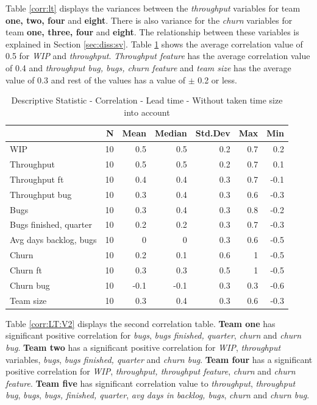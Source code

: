 \documentclass[UKenglish]{ifimaster}  %
\begin{document}
Table \ref{corr:lt} displays the variances between the \textit{throughput} variables for team \textbf{one, two, four} and \textbf{eight}. There is also variance for the \textit{churn} variables for team \textbf{one, three, four} and \textbf{eight}. The relationship between these variables is explained in Section \ref{sec:diss:sv}. Table \ref{DS:corr:LT} shows the average correlation value of 0.5 for \textit{WIP} and \textit{throughput}. \textit{Throughput feature} has the average correlation value of 0.4 and \textit{throughput bug, bugs, churn feature} and \textit{team size} has the average value of 0.3 and rest of the values has a value of $\pm$ 0.2 or less.



\begin{table}[H]
 \centering
 \begin{tabular}{ | l | r | r | r | r | r | r | }
 \hline
 & \bf{N} & \bf{Mean} & \bf{Median} & \bf{Std.Dev} & \bf{Max} & \bf{Min} \\ \hline
WIP  & 10 & 0.5 & 0.5 & 0.2 & 0.7 & 0.2\\ \hline
Throughput  & 10 & 0.5 & 0.5 & 0.2 & 0.7 & 0.1\\ \hline
Throughput ft  & 10 & 0.4 & 0.4 & 0.3 & 0.7 & -0.1\\ \hline
Throughput bug  & 10 & 0.3 & 0.4 & 0.3 & 0.6 & -0.3\\ \hline
Bugs  & 10 & 0.3 & 0.4 & 0.3 & 0.8 & -0.2\\ \hline
Bugs finished, quarter  & 10 & 0.2 & 0.2 & 0.3 & 0.7 & -0.3\\ \hline
Avg days backlog, bugs  & 10 & 0 & 0 & 0.3 & 0.6 & -0.5\\ \hline
Churn  & 10 & 0.2 & 0.1 & 0.6 & 1 & -0.5\\ \hline
Churn ft  & 10 & 0.3 & 0.3 & 0.5 & 1 & -0.5\\ \hline
Churn bug  & 10 & -0.1 & -0.1 & 0.3 & 0.3 & -0.6\\ \hline
Team size  & 10 & 0.3 & 0.4 & 0.3 & 0.6 & -0.3\\ \hline
\end{tabular}
 \caption{Descriptive Statistic - Correlation - Lead time - Without taken time size into account}
 \label{DS:corr:LT}
 \end{table}

Table \ref{corr:LT:V2} displays the second correlation table. \textbf{Team one} has significant positive correlation for \textit{bugs}, \textit{bugs finished, quarter}, \textit{churn} and \textit{churn bug}. \textbf{Team two} has a significant positive correlation for  \textit{WIP}, \textit{throughput} variables, \textit{bugs}, \textit{bugs finished, quarter} and \textit{churn bug}.  \textbf{Team four} has a significant positive correlation for \textit{WIP}, \textit{throughput, throughput feature}, \textit{churn} and \textit{churn feature}. \textbf{Team five} has significant correlation value to \textit{throughput}, \textit{throughput bug}, \textit{bugs}, \textit{bugs, finished, quarter}, \textit{avg days in backlog, bugs}, \textit{churn} and \textit{churn bug}.
\end{document}
